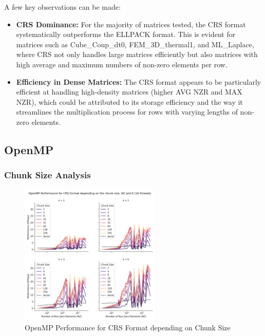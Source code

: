 \documentclass[12pt,oneside]{book} %
\begin{document}
A few key observations can be made:
\begin{itemize}
    \item \textbf{CRS Dominance:} For the majority of matrices tested, the CRS format systematically outperforms the ELLPACK format. This is evident for matrices such as Cube\_Coup\_dt0, FEM\_3D\_thermal1, and ML\_Laplace, where CRS not only handles large matrices efficiently but also matrices with high average and maximum numbers of non-zero elements per row.
    \item \textbf{Efficiency in Dense Matrices:} The CRS format appears to be particularly efficient at handling high-density matrices (higher AVG NZR and MAX NZR), which could be attributed to its storage efficiency and the way it streamlines the multiplication process for rows with varying lengths of non-zero elements.
\end{itemize}

\subsection{OpenMP}
\subsubsection{Chunk Size Analysis}
\begin{figure}[H]
    \centering
    \includegraphics[width=0.6\textwidth]{../results/images/openMP_ChunkSize_CRS.png}
    \caption{OpenMP Performance for CRS Format depending on Chunk Size}
    \label{fig:openmpchunksizecrs}
\end{figure}
\end{document}
